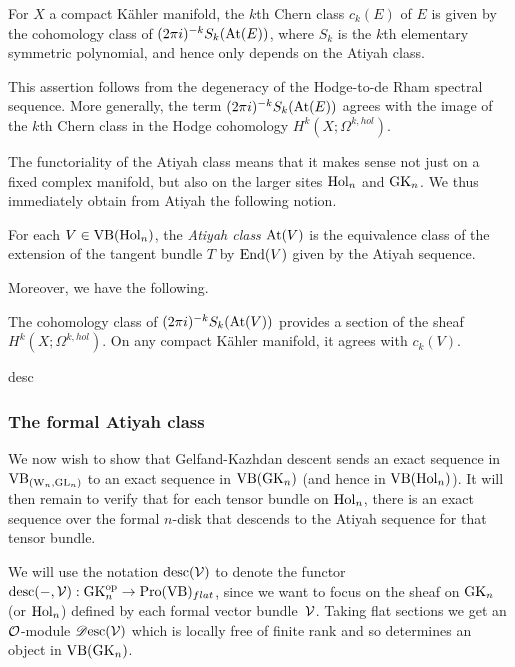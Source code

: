 \begin{prop}
For $X$ a compact K\"ahler manifold, the $k$th Chern class $c_k(E)$ of $E$ is given by the cohomology class of $(2\pi i)^{-k} S_k({\rm At}(E))$, 
where $S_k$ is the $k$th elementary symmetric polynomial, and hence only depends on the Atiyah class.
\end{prop}

This assertion follows from the degeneracy of the Hodge-to-de Rham
spectral sequence. More generally, the term $(2\pi i)^{-k}
S_k({\rm At}(E))$ agrees with the image of the $k$th Chern class in the
Hodge cohomology $H^k(X ; \Omega^{k,hol})$.

The functoriality of the Atiyah class means that it makes sense not just on a fixed complex manifold, but also on the larger sites ${\rm Hol}_n$ and ${\rm GK}_n$. 
We thus immediately obtain from Atiyah the following notion.

\begin{dfn}
For each $V \in {\rm VB}({\rm Hol}_n)$, the {\em Atiyah class} ${\rm At}(V)$ is the equivalence class of the extension of the tangent bundle $T$ by ${\rm End}(V)$ given by the Atiyah sequence.
\end{dfn}

Moreover, we have the following.

\begin{lem}
The cohomology class of $(2\pi i)^{-k} S_k({\rm At}(V))$ provides a section
of the sheaf $H^k(X ; \Omega^{k,hol})$. On any compact K\"ahler manifold, it agrees with $c_k(V)$.
\end{lem}
desc
\subsubsection{The formal Atiyah class}

We now wish to show that Gelfand-Kazhdan descent sends an exact sequence in ${\rm VB}_{({{\rm W}_n}, {\rm GL}_n)}$ to an exact sequence in ${\rm VB}({\rm GK}_n)$ (and hence in ${\rm VB}({\rm Hol}_n)$). 
It will then remain to verify that for each tensor bundle on ${\rm Hol}_n$, 
there is an exact sequence over the formal $n$-disk that descends to the Atiyah sequence for that tensor bundle.

We will use the notation ${\rm desc}(\mathcal{V})$ to denote the functor ${\rm desc}(-,\mathcal{V}): {\rm GK}_n^{{\rm op}} \to {\rm Pro}({\rm VB})_{flat}$, 
since we want to focus on the sheaf on ${\rm GK}_n$ (or ${\rm Hol}_n$) defined
by each formal vector bundle~$\mathcal{V}$. Taking flat sections we get an
$\mathcal O$-module $\mathscr{D}{\rm esc}(\mathcal{V})$ which is locally free of finite
rank and so determines an object in ${\rm VB}({\rm GK}_n)$. 

